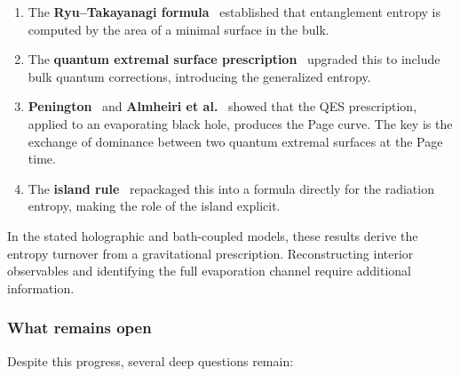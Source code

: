 \documentclass[11pt,letterpaper]{article}
\theoremstyle{plain}
\theoremstyle{definition}
\theoremstyle{remark}
\begin{document}
\begin{enumerate}
\item The \textbf{Ryu--Takayanagi formula}~\citep{ryutakayanagi2006}
  established that entanglement entropy is computed by the area of a
  minimal surface in the bulk.

\item The \textbf{quantum extremal surface
  prescription}~\citep{engelhardtwall2015} upgraded this to include
  bulk quantum corrections, introducing the generalized entropy.

\item \textbf{Penington}~\citeyearpar{penington2020} and \textbf{Almheiri et
  al.}~\citeyearpar{almheirietal2019} showed that the QES prescription,
  applied to an evaporating black hole, produces the Page
  curve.  The key is the exchange of dominance between two
  quantum extremal surfaces at the Page time.

\item The \textbf{island rule}~\citep{almheirietal2020islands}
  repackaged this into a formula directly for the radiation entropy,
  making the role of the island explicit.
\end{enumerate}

In the stated holographic and bath-coupled models, these results derive
the entropy turnover from a gravitational prescription. Reconstructing
interior observables and identifying the full evaporation channel require
additional information.

\subsubsection*{What remains open}

Despite this progress, several deep questions remain:
\end{document}
